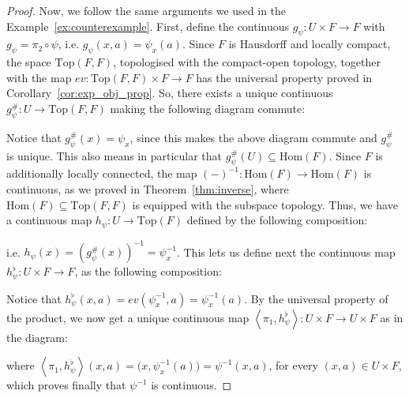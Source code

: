 \begin{proof}
Now, we follow the same arguments we used in the Example~\ref{ex:counterexample}. First, define the continuous $g_{\psi}:U\times F\to F$ with $g_{\psi}=\pi_2\circ\psi$, i.e. $g_{\psi}(x,a)=\psi_x(a)$. Since $F$ is Hausdorff and locally compact, the space $\mathrm{Top}(F,F)$, topologised with the compact-open topology, together with the map $ev:\mathrm{Top}(F,F)\times F\to F$ has the universal property proved in Corollary~\ref{cor:exp_obj_prop}. So, there exists a unique continuous $g_{\psi}^{\#}:U\to\mathrm{Top}(F,F)$ making the following diagram commute:
\begin{center}
\end{center}
Notice that $g_{\psi}^{\#}(x)=\psi_x$, since this makes the above diagram commute and $g_{\psi}^{\#}$ is unique. This also means in particular that $g_{\psi}^{\#}(U)\subseteq\mathrm{Hom}(F)$. Since $F$ is additionally locally connected, the map $(-)^{-1}:\mathrm{Hom}(F)\to\mathrm{Hom}(F)$ is continuous, as we proved in Theorem~\ref{thm:inverse}, where $\mathrm{Hom}(F)\subseteq\mathrm{Top}(F,F)$ is equipped with the subspace topology. Thus, we have a continuous map $h_{\psi}:U\to\mathrm{Top}(F)$ defined by the following composition:
\vspace*{-1em}
\begin{center}
\end{center}
i.e. $h_{\psi}(x)=(g_{\psi}^{\#}(x))^{-1}=\psi^{-1}_x$. This lets us define next the continuous map $h_{\psi}^{\flat}:U\times F\to F$, as the following composition:
\begin{center}
\end{center}
Notice that $h_{\psi}^{\flat}(x,a)=ev(\psi^{-1}_x,a)=\psi^{-1}_x(a)$. By the universal property of the product, we now get a unique continuous map $\left<\pi_1,h_{\psi}^{\flat}\right>:U\times F\to U\times F$ as in the diagram:
\begin{center}
\end{center}
where $\left<\pi_1,h_{\psi}^{\flat}\right>(x,a)=\big(x,\psi_x^{-1}(a)\big)=\psi^{-1}(x,a)$, for every $(x,a)\in U\times F$, which proves finally that $\psi^{-1}$ is continuous.
\end{proof}



